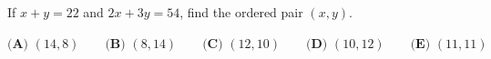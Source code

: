 If \(x+y=22\) and \(2x+3y=54\), find the ordered pair \((x,y)\).

\(\textbf{(A) } (14,8) \qquad\textbf{(B) } (8,14) \qquad\textbf{(C) } (12,10) \qquad\textbf{(D) } (10,12) \qquad\textbf{(E) } (11,11)\)
